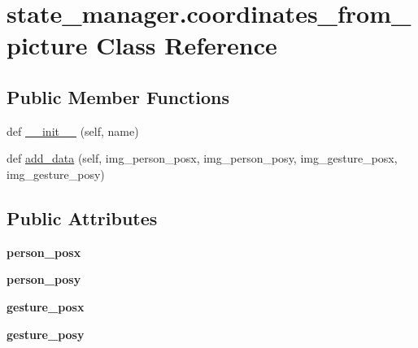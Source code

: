 \hypertarget{classstate__manager_1_1coordinates__from__picture}{}\section{state\+\_\+manager.\+coordinates\+\_\+from\+\_\+picture Class Reference}
\label{classstate__manager_1_1coordinates__from__picture}
\subsection*{Public Member Functions}
\begin{DoxyCompactItemize}
\item 
def \hyperlink{classstate__manager_1_1coordinates__from__picture_a1cfcda6b1096fe141974378b701b9402}{\+\_\+\+\_\+init\+\_\+\+\_\+} (self, name)
\item 
def \hyperlink{classstate__manager_1_1coordinates__from__picture_a480690c0f23cc43b67c9ed8343c41e19}{add\+\_\+data} (self, img\+\_\+person\+\_\+posx, img\+\_\+person\+\_\+posy, img\+\_\+gesture\+\_\+posx, img\+\_\+gesture\+\_\+posy)
\end{DoxyCompactItemize}
\subsection*{Public Attributes}
\begin{DoxyCompactItemize}
\item 
{\bfseries person\+\_\+posx}\hypertarget{classstate__manager_1_1coordinates__from__picture_a9c453774ff4cc0644deb040473934bdc}{}\label{classstate__manager_1_1coordinates__from__picture_a9c453774ff4cc0644deb040473934bdc}

\item 
{\bfseries person\+\_\+posy}\hypertarget{classstate__manager_1_1coordinates__from__picture_aabe7e4fb692c99db14d42b6bdd79a656}{}\label{classstate__manager_1_1coordinates__from__picture_aabe7e4fb692c99db14d42b6bdd79a656}

\item 
{\bfseries gesture\+\_\+posx}\hypertarget{classstate__manager_1_1coordinates__from__picture_a945328edc4ceccd3ab9e72b44e785a37}{}\label{classstate__manager_1_1coordinates__from__picture_a945328edc4ceccd3ab9e72b44e785a37}

\item 
{\bfseries gesture\+\_\+posy}\hypertarget{classstate__manager_1_1coordinates__from__picture_a4e1df084f290ebf50ce72a6eff5f938d}{}\label{classstate__manager_1_1coordinates__from__picture_a4e1df084f290ebf50ce72a6eff5f938d}

\end{DoxyCompactItemize}


